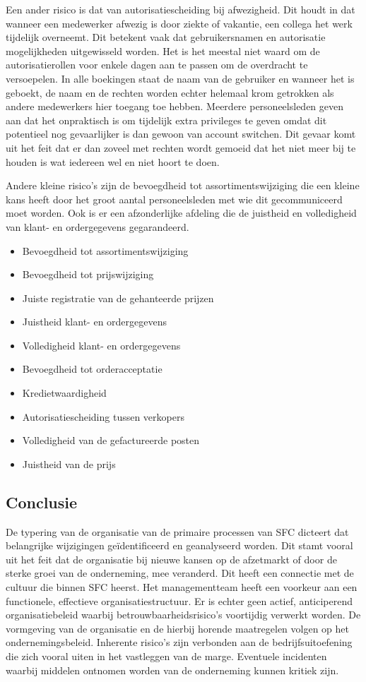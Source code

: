 Een ander risico is dat van autorisatiescheiding bij afwezigheid. Dit houdt in dat wanneer een medewerker afwezig is door ziekte of vakantie, een collega het werk tijdelijk overneemt. Dit betekent vaak dat gebruikersnamen en autorisatie mogelijkheden uitgewisseld worden. Het is het meestal niet waard om de autorisatierollen voor enkele dagen aan te passen om de overdracht te versoepelen. In alle boekingen staat de naam van de gebruiker en wanneer het is geboekt, de naam en de rechten worden echter helemaal krom getrokken als andere medewerkers hier toegang toe hebben. Meerdere personeelsleden geven aan dat het onpraktisch is om tijdelijk extra privileges te geven omdat dit potentieel nog gevaarlijker is dan gewoon van account switchen. Dit gevaar komt uit het feit dat er dan zoveel met rechten wordt gemoeid dat het niet meer bij te houden is wat iedereen wel en niet hoort te doen. 

Andere kleine risico's zijn de bevoegdheid tot assortimentswijziging die een kleine kans heeft door het groot aantal personeelsleden met wie dit gecommuniceerd moet worden. Ook is er een afzonderlijke afdeling die de juistheid en volledigheid van klant- en ordergegevens gegarandeerd. 

\begin{itemize}
    \item Bevoegdheid tot assortimentswijziging
    \item Bevoegdheid tot prijswijziging
    \item Juiste registratie van de gehanteerde prijzen
    \item Juistheid klant- en ordergegevens
    \item Volledigheid klant- en ordergegevens
    \item Bevoegdheid tot orderacceptatie
    \item Kredietwaardigheid
    \item Autorisatiescheiding tussen verkopers
    \item Volledigheid van de gefactureerde posten
    \item Juistheid van de prijs
\end{itemize}

\subsection*{Conclusie}
De typering van de organisatie van de primaire processen van SFC dicteert dat belangrijke wijzigingen geïdentificeerd en geanalyseerd worden. Dit stamt vooral uit het feit dat de organisatie bij nieuwe kansen op de afzetmarkt of door de sterke groei van de onderneming, mee veranderd. Dit heeft een connectie met de cultuur die binnen SFC heerst. Het managementteam heeft een voorkeur aan een functionele, effectieve organisatiestructuur. Er is echter geen actief, anticiperend organisatiebeleid waarbij betrouwbaarheidsrisico's voortijdig verwerkt worden. De vormgeving van de organisatie en de hierbij horende maatregelen volgen op het ondernemingsbeleid. Inherente risico's zijn verbonden aan de bedrijfsuitoefening die zich vooral uiten in het vastleggen van de marge. Eventuele incidenten waarbij middelen ontnomen worden van de onderneming kunnen kritiek zijn. 

